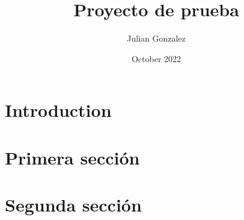 \documentclass{article}
\title{Proyecto de prueba}
\author{Julian Gonzalez}
\date{October 2022}
\begin{document}
\maketitle

\section{Introduction}

\section{Primera sección}
\section{Segunda sección}
\end{document}
